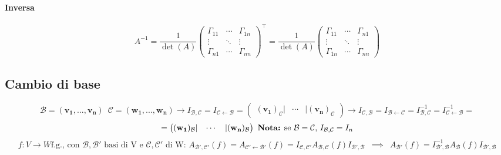 \documentclass[10pt]{article}
\theoremstyle{plain}
\begin{document}
\paragraph{Inversa}
\[A^{-1} = \frac{1}{\det(A)} \begin{pmatrix}
    \Gamma_{11} & \cdots & \Gamma_{1n}\\
    \vdots & \ddots & \vdots\\
    \Gamma_{n1} & \cdots & \Gamma_{nn}
\end{pmatrix}^\top = \frac{1}{\det(A)} \begin{pmatrix}
    \Gamma_{11} & \cdots & \Gamma_{n1}\\
    \vdots & \ddots & \vdots\\
    \Gamma_{1n} & \cdots & \Gamma_{nn}\end{pmatrix}\]
\subsection*{Cambio di base}
\[\mathcal{B} = (\mathbf{v_1}, ... , \mathbf{v_n})  \enspace \mathcal{C} = (\mathbf{w_1}, ... , \mathbf{w_n}) \rightarrow I_{\mathcal{B}, \mathcal{C}} = I_{\mathcal{C} \leftarrow \mathcal{B}} = \begin{pmatrix}
    (\mathbf{v_1})_{\mathcal{C}} | & \cdots & | (\mathbf{v_n})_{\mathcal{C}}
\end{pmatrix} \rightarrow I_{\mathcal{C}, \mathcal{B}} = I_{\mathcal{B} \leftarrow \mathcal{C}} = I_{\mathcal{B}, \mathcal{C}}^{-1} = I_{\mathcal{C} \leftarrow \mathcal{B}}^{-1} =\] \[ = \begin{pmatrix}
    (\mathbf{w_1})_{\mathcal{B}} | & \cdots & | (\mathbf{w_n})_{\mathcal{B}}
\end{pmatrix} \textrm{ \textbf{Nota:} se $\mathcal{B} = \mathcal{C}$, $I_{\mathcal{B}, \mathcal{C}} = I_n$}\]
\[f : V \rightarrow W \textrm{f.g., con $\mathcal{B}, \mathcal{B'}$ basi di V e $\mathcal{C}, \mathcal{C'}$ di W: } A_{\mathcal{B'}, \mathcal{C'}}(f) = A_{\mathcal{C'} \leftarrow \mathcal{B'}}(f) = I_{\mathcal{C}, \mathcal{C'}} A_{\mathcal{B}, \mathcal{C}}(f) I_{\mathcal{B'}, \mathcal{B}} \enspace \implies \enspace A_{\mathcal{B'}}(f) = I_{\mathcal{B'}, \mathcal{B}}^{-1} A_{\mathcal{B}}(f) I_{\mathcal{B'}, \mathcal{B}}\]
\end{document}
